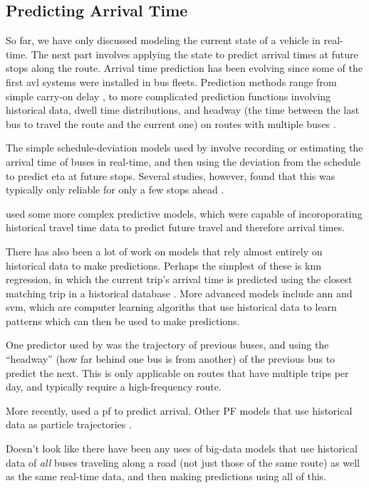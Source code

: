 \documentclass[12pt,a4paper]{article}
\begin{document}
\subsection{Predicting Arrival Time}
\label{sec:arrivaltimeprediction}

So far, we have only discussed modeling the current state of a vehicle in real-time.
The next part involves applying the state to predict arrival times at future stops along the route.
Arrival time prediction has been evolving since some of the first \gls{avl}
systems were installed in bus fleets.
Prediction methods range from simple carry-on delay \citep{cn},
to more complicated prediction functions involving historical data,
dwell time distributions, 
and headway (the time between the last bus to travel the route and the current one)
on routes with multiple buses 
\citep{cn}.


The simple schedule-deviation models used by \cite{dailey:2001} involve
recording or estimating the arrival time of buses in real-time,
and then using the deviation from the schedule to predict \gls{eta}
at future stops.
Several studies, however, found that this was typically only reliable for only a few stops ahead
\citep{cn}.


\cite{cathey-dailey:2003} used some more complex predictive models, 
which were capable of incoroporating historical travel time
data to predict future travel and therefore arrival times.

There has also been a lot of work on models that rely almost entirely on historical 
data to make predictions.
Perhaps the simplest of these is \gls{knn} regression,
in which the current trip's arrival time is predicted using the closest
matching trip in a historical database \citep{cn}.
More advanced models include \gls{ann} and \gls{svm},
which are computer learning algoriths that use historical data to
learn patterns which can then be used to make predictions.

One predictor used by \cite{cn} was the trajectory of previous buses,
and using the ``headway'' (how far behind one bus is from another)
of the previous bus to predict the next.
This is only applicable on routes that have multiple trips per day,
and typically require a high-frequency route.


More recently, \cite{hans-etal:2015} used a \gls{pf} to predict arrival.
Other PF models that use historical data as particle trajectories
\citep{chen-rakha:2014}.


Doesn't look like there have been any uses of big-data models that use
historical data of \emph{all} buses traveling along a road
(not just those of the same route) as well as the same real-time data,
and then making predictions using all of this.
\end{document}
